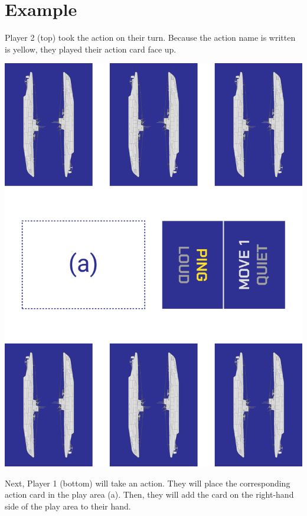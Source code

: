 \section*{Example}
Player 2 (top) took the \PPING{} action on their turn.
Because the action name is written is yellow, they played their action card face up.

\vspace{-1ex}

\begin{center}
\includegraphics[width=0.5\linewidth]{example_diagram.pdf}
\end{center}

\vspace{-1ex}

Next, Player 1 (bottom) will take an action. They will place the corresponding action card in the play area (a).
Then, they will add the card on the right-hand side of the play area to their hand.
